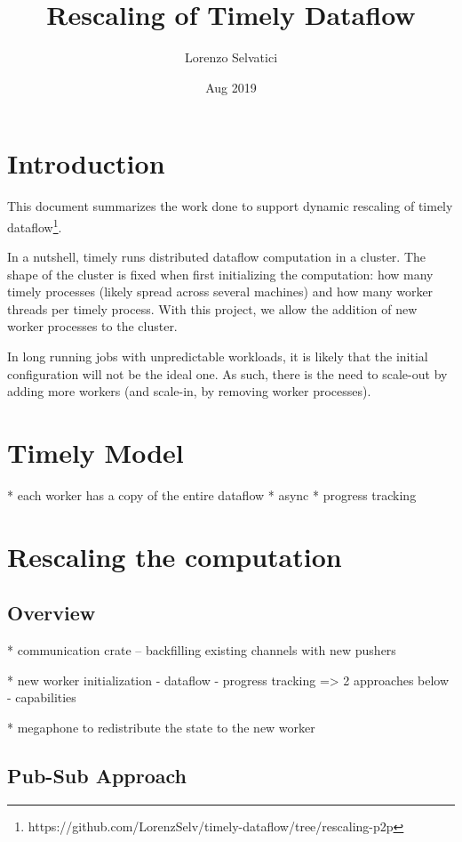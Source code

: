 \documentclass[12pt]{extarticle}
\title{Rescaling of Timely Dataflow}
\author{Lorenzo Selvatici}
\date{Aug 2019}
\begin{document}
\maketitle

\section{Introduction}

This document summarizes the work done to support dynamic rescaling of timely dataflow\footnote{https://github.com/LorenzSelv/timely-dataflow/tree/rescaling-p2p}.

In a nutshell, timely runs distributed dataflow computation in a cluster. The shape of the cluster is fixed
when first initializing the computation: how many timely processes (likely spread across several machines) and how many worker threads per timely process.
With this project, we allow the addition of new worker processes to the cluster.

In long running jobs with unpredictable workloads, it is likely that the initial configuration will not be the ideal one.
As such, there is the need to scale-out by adding more workers (and scale-in, by removing worker processes).

\section{Timely Model}


* each worker has a copy of the entire dataflow
* async
* progress tracking

\section{Rescaling the computation}

\subsection{Overview}

* communication crate -- backfilling existing channels with new pushers

* new worker initialization
  - dataflow
  - progress tracking => 2 approaches below
  - capabilities

* megaphone to redistribute the state to the new worker

\subsection{Pub-Sub Approach}
\end{document}
